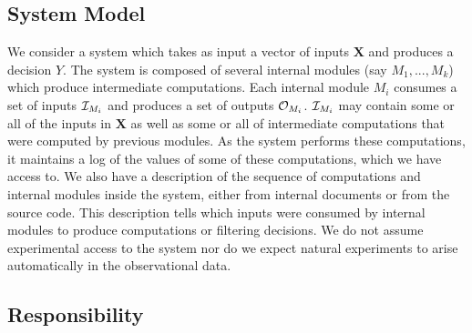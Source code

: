 \documentclass[10pt, onecolumn]{report}
\begin{document}

\subsection{System Model}

We consider a system which takes as input a vector of 
inputs $\mathbf{X}$ and produces a decision $Y$. 
The system is composed of several internal modules (say $M_1, ..., M_k$) 
which produce intermediate
computations. Each internal module $M_i$ consumes a set of inputs $\mathcal{I}_{M_i}$
and produces a set of outputs $\mathcal{O}_{M_i}$. $\mathcal{I}_{M_i}$ may contain
some or all of the inputs in $\mathbf{X}$ as well as some or all of intermediate 
computations that were computed by previous modules. 
As the system performs these computations, it maintains a log of 
the values of some of these computations, which we have access to.
We also have a description of the 
sequence of computations and internal modules inside the system, either from 
internal documents or from the source code. This description tells which inputs were
consumed by internal modules to produce computations or filtering decisions. 
We do not assume experimental access to the system nor do we 
expect natural experiments to arise automatically in the observational data. 

\subsection{Responsibility}
\end{document}
